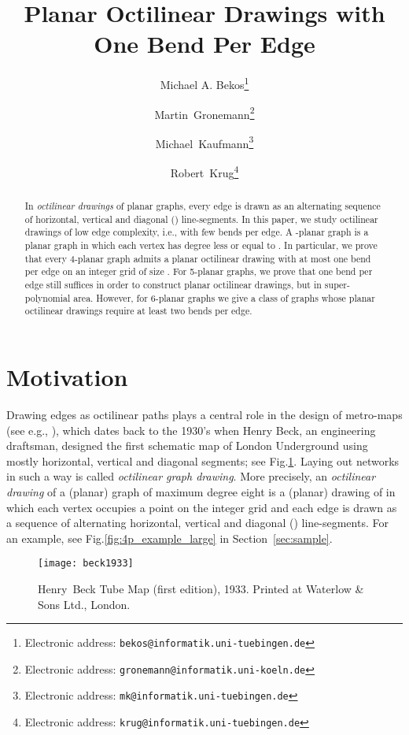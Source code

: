 \documentclass[a4paper,twoside,11pt]{article}
\title{Planar Octilinear Drawings with One Bend Per Edge}
\author[1]{Michael A. Bekos\thanks{Electronic address: \texttt{bekos@informatik.uni-tuebingen.de}}}
\author[2]{Martin~Gronemann\thanks{Electronic address: \texttt{gronemann@informatik.uni-koeln.de}}}
\author[1]{Michael~Kaufmann\thanks{Electronic address: \texttt{mk@informatik.uni-tuebingen.de}}}
\author[1]{Robert~Krug\thanks{Electronic address: \texttt{krug@informatik.uni-tuebingen.de}}}
\affil[1]{Wilhelm-Schickhard-Institut f\"ur Informatik, Universit\"at T\"ubingen, Germany}
\affil[2]{Institut f\"ur Informatik, Universit\"at zu K\"oln, Germany}
\date{}
\begin{document}
\maketitle

\begin{abstract}
In \emph{octilinear drawings} of planar graphs, every edge is drawn
as an alternating sequence of horizontal, vertical and diagonal
() line-segments. In this paper, we study octilinear
drawings of low edge complexity, i.e., with few bends per edge. A
-planar graph is a planar graph in which each vertex has degree
less or equal to . In particular, we prove that every 4-planar
graph admits a planar octilinear drawing with at most one bend per
edge on an integer grid of size . For 5-planar
graphs, we prove that one bend per edge still suffices in order to
construct planar octilinear drawings, but in super-polynomial area.
However, for 6-planar graphs we give a class of graphs whose planar
octilinear drawings require at least two bends per edge.
\end{abstract}


\section{Motivation}
\label{sec:introduction}



Drawing edges as octilinear paths plays a central role in the design
of metro-maps (see e.g., \cite{HMN06,NW11,SROW11}), which dates back
to the 1930's when Henry Beck, an engineering draftsman, designed
the first schematic map of London Underground using mostly
horizontal, vertical and diagonal segments; see
Fig.\ref{fig:beck1933}. Laying out networks in such a way is called
\emph{octilinear graph drawing}. More precisely, an \emph{octilinear
drawing} of a (planar) graph  of maximum degree eight is a
(planar) drawing  of  in which each vertex occupies a
point on the integer grid and each edge is drawn as a sequence of
alternating horizontal, vertical and diagonal ()
line-segments. For an example, see Fig.\ref{fig:4p_example_large} in
Section~\ref{sec:sample}.

\begin{figure}[t]
    \centering
    \texttt{[image: beck1933]}
    \caption{Henry~Beck Tube Map (first edition), 1933. Printed at Waterlow \& Sons Ltd., London.}
    \label{fig:beck1933}
\end{figure}
\end{document}
